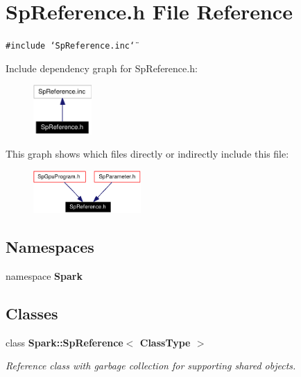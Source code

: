 \section{Sp\-Reference.h File Reference}
\label{SpReference_8h}
{\tt \#include \char`\"{}Sp\-Reference.inc\char`\"{}}\par


Include dependency graph for Sp\-Reference.h:\begin{figure}[H]
\begin{center}
\leavevmode
\includegraphics[width=63pt]{SpReference_8h__incl}
\end{center}
\end{figure}


This graph shows which files directly or indirectly include this file:\begin{figure}[H]
\begin{center}
\leavevmode
\includegraphics[width=116pt]{SpReference_8h__dep__incl}
\end{center}
\end{figure}
\subsection*{Namespaces}
\begin{CompactItemize}
\item 
namespace {\bf Spark}
\end{CompactItemize}
\subsection*{Classes}
\begin{CompactItemize}
\item 
class {\bf Spark::Sp\-Reference$<$ Class\-Type $>$}
\begin{CompactList}\small\item\em Reference class with garbage collection for supporting shared objects. \item\end{CompactList}\end{CompactItemize}
